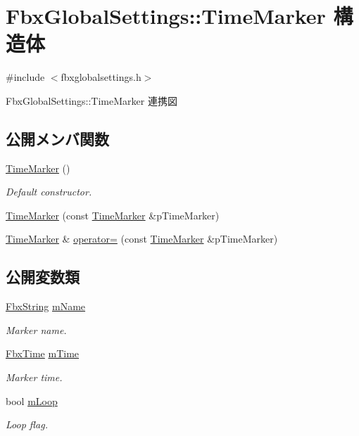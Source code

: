 \hypertarget{struct_fbx_global_settings_1_1_time_marker}{}\section{Fbx\+Global\+Settings\+:\+:Time\+Marker 構造体}
\label{struct_fbx_global_settings_1_1_time_marker}


{\ttfamily \#include $<$fbxglobalsettings.\+h$>$}



Fbx\+Global\+Settings\+:\+:Time\+Marker 連携図
\subsection*{公開メンバ関数}
\begin{DoxyCompactItemize}
\item 
\hyperlink{struct_fbx_global_settings_1_1_time_marker_a6d04ed8237bfea2a942a9d25195c08f8}{Time\+Marker} ()
\begin{DoxyCompactList}\small\item\em Default constructor. \end{DoxyCompactList}\item 
\hyperlink{struct_fbx_global_settings_1_1_time_marker_a6fc55ef604d2093fc58471963e7dba8d}{Time\+Marker} (const \hyperlink{struct_fbx_global_settings_1_1_time_marker}{Time\+Marker} \&p\+Time\+Marker)
\item 
\hyperlink{struct_fbx_global_settings_1_1_time_marker}{Time\+Marker} \& \hyperlink{struct_fbx_global_settings_1_1_time_marker_a9c13f5762aece4d2aa93d4cc5c3f7b7a}{operator=} (const \hyperlink{struct_fbx_global_settings_1_1_time_marker}{Time\+Marker} \&p\+Time\+Marker)
\end{DoxyCompactItemize}
\subsection*{公開変数類}
\begin{DoxyCompactItemize}
\item 
\hyperlink{class_fbx_string}{Fbx\+String} \hyperlink{struct_fbx_global_settings_1_1_time_marker_a625789fde7114541d6620bb21e5a3b23}{m\+Name}
\begin{DoxyCompactList}\small\item\em Marker name. \end{DoxyCompactList}\item 
\hyperlink{class_fbx_time}{Fbx\+Time} \hyperlink{struct_fbx_global_settings_1_1_time_marker_abd5a09781e525fb49ba07310d03f1d9a}{m\+Time}
\begin{DoxyCompactList}\small\item\em Marker time. \end{DoxyCompactList}\item 
bool \hyperlink{struct_fbx_global_settings_1_1_time_marker_af9f10266f6d65a9bf7ca315107407b20}{m\+Loop}
\begin{DoxyCompactList}\small\item\em Loop flag. \end{DoxyCompactList}\end{DoxyCompactItemize}


